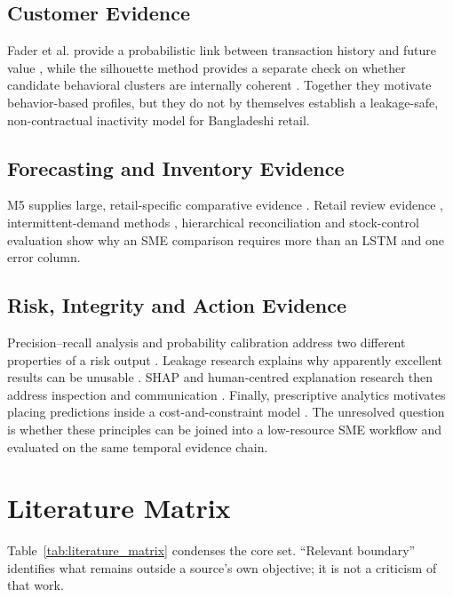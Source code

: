\subsection{Customer Evidence}

Fader et al. provide a probabilistic link between transaction history and
future value \cite{fader2005rfm}, while the silhouette method provides a
separate check on whether candidate behavioral clusters are internally coherent
\cite{rousseeuw1987silhouettes}. Together they motivate behavior-based profiles,
but they do not by themselves establish a leakage-safe, non-contractual
inactivity model for Bangladeshi retail.

\subsection{Forecasting and Inventory Evidence}

M5 supplies large, retail-specific comparative evidence
\cite{makridakis2022m5}. Retail review evidence
\cite{fildes2022retail}, intermittent-demand methods
\cite{croston1972intermittent,syntetos2005intermittent}, hierarchical
reconciliation \cite{hyndman2011hierarchical} and stock-control evaluation
\cite{syntetos2010stock} show why an SME comparison requires more than an LSTM
and one error column.

\subsection{Risk, Integrity and Action Evidence}

Precision--recall analysis and probability calibration address two different
properties of a risk output
\cite{saito2015pr,niculescu2005calibration}. Leakage research explains why
apparently excellent results can be unusable \cite{kaufman2012leakage}.
SHAP and human-centred explanation research then address inspection and
communication \cite{lundberg2017shap,miller2019explanation}. Finally,
prescriptive analytics motivates
placing predictions inside a cost-and-constraint model
\cite{bertsimas2020prescriptive}. The unresolved question is whether these
principles can be joined into a low-resource SME workflow and evaluated on the
same temporal evidence chain.

\section{Literature Matrix}

Table~\ref{tab:literature_matrix} condenses the core set. ``Relevant boundary''
identifies what remains outside a source's own objective; it is not a criticism
of that work.

